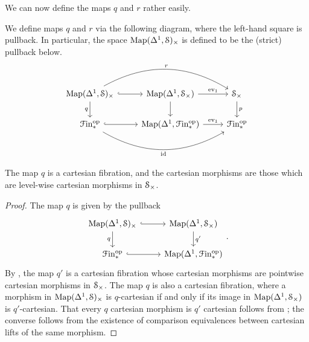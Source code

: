 \documentclass[main.tex]{subfiles}
\begin{document}
We can now define the maps $q$ and $r$ rather easily.

\begin{definition}
  We define maps $q$ and $r$ via the following diagram, where the left-hand square is pullback. In particular, the space $\Map(\Delta^{1}, \S)_{\times}$ is defined to be the (strict) pullback below.
  \begin{equation*}
    \begin{tikzcd}
      \Map(\Delta^{1}, \S)_{\times}
      \arrow[r, hook]
      \arrow[rr, bend left, "r"]
      \arrow[d, swap, "q"]
      & \Map(\Delta^{1}, \S_{\times})
      \arrow[r, "\ev_{1}"]
      \arrow[d]
      & \S_{\times}
      \arrow[d, "p"]
      \\
      \Finp\op
      \arrow[r, hook]
      \arrow[rr, bend right, swap, "\id"]
      & \Map(\Delta^{1}, \Finp\op)
      \arrow[r, "\ev_{1}"]
      & \Finp\op
    \end{tikzcd}
  \end{equation*}
\end{definition}

\begin{lemma}
  The map $q$ is a cartesian fibration, and the cartesian morphisms are those which are level-wise cartesian morphisms in $\S_{\times}$.
\end{lemma}
\begin{proof}
  The map $q$ is given by the pullback
  \begin{equation*}
    \begin{tikzcd}
      \Map(\Delta^{1}, \category{S})_{\times}
      \arrow[r, hook]
      \arrow[d, swap, "q"]
      & \Map(\Delta^{1}, \category{S}_{\times})
      \arrow[d, "q'"]
      \\
      \Finp\op
      \arrow[r, hook]
      & \Map(\Delta^{1}, \Finp\op)
    \end{tikzcd}.
  \end{equation*}
  By \cite[Prop.\ 3.1.2.1]{highertopostheory}, the map $q'$ is a cartesian fibration whose cartesian morphisms are pointwise cartesian morphisms in $\S_{\times}$. The map $q$ is also a cartesian fibration, where a morphism in $\Map(\Delta^{1}, \S)_{\times}$ is $q$-cartesian if and only if its image in $\Map(\Delta^{1}, \S_{\times})$ is $q'$-cartesian. That every $q$ cartesian morphism is $q'$ cartesian follows from \cite[Prop\ 2.4.1.3]{highertopostheory}; the converse follows from the existence of comparison equivalences between cartesian lifts of the same morphism.
\end{proof}
\end{document}
